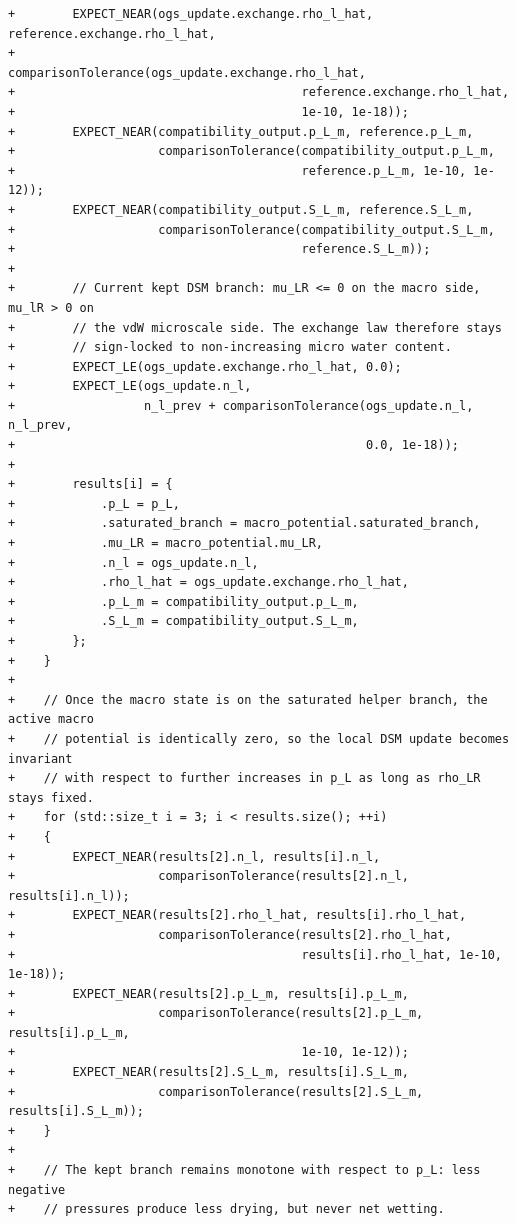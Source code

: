 \documentclass[10pt]{article}
\begin{document}
\begin{lstlisting}
+        EXPECT_NEAR(ogs_update.exchange.rho_l_hat, reference.exchange.rho_l_hat,
+                    comparisonTolerance(ogs_update.exchange.rho_l_hat,
+                                        reference.exchange.rho_l_hat,
+                                        1e-10, 1e-18));
+        EXPECT_NEAR(compatibility_output.p_L_m, reference.p_L_m,
+                    comparisonTolerance(compatibility_output.p_L_m,
+                                        reference.p_L_m, 1e-10, 1e-12));
+        EXPECT_NEAR(compatibility_output.S_L_m, reference.S_L_m,
+                    comparisonTolerance(compatibility_output.S_L_m,
+                                        reference.S_L_m));
+
+        // Current kept DSM branch: mu_LR <= 0 on the macro side, mu_lR > 0 on
+        // the vdW microscale side. The exchange law therefore stays
+        // sign-locked to non-increasing micro water content.
+        EXPECT_LE(ogs_update.exchange.rho_l_hat, 0.0);
+        EXPECT_LE(ogs_update.n_l,
+                  n_l_prev + comparisonTolerance(ogs_update.n_l, n_l_prev,
+                                                 0.0, 1e-18));
+
+        results[i] = {
+            .p_L = p_L,
+            .saturated_branch = macro_potential.saturated_branch,
+            .mu_LR = macro_potential.mu_LR,
+            .n_l = ogs_update.n_l,
+            .rho_l_hat = ogs_update.exchange.rho_l_hat,
+            .p_L_m = compatibility_output.p_L_m,
+            .S_L_m = compatibility_output.S_L_m,
+        };
+    }
+
+    // Once the macro state is on the saturated helper branch, the active macro
+    // potential is identically zero, so the local DSM update becomes invariant
+    // with respect to further increases in p_L as long as rho_LR stays fixed.
+    for (std::size_t i = 3; i < results.size(); ++i)
+    {
+        EXPECT_NEAR(results[2].n_l, results[i].n_l,
+                    comparisonTolerance(results[2].n_l, results[i].n_l));
+        EXPECT_NEAR(results[2].rho_l_hat, results[i].rho_l_hat,
+                    comparisonTolerance(results[2].rho_l_hat,
+                                        results[i].rho_l_hat, 1e-10, 1e-18));
+        EXPECT_NEAR(results[2].p_L_m, results[i].p_L_m,
+                    comparisonTolerance(results[2].p_L_m, results[i].p_L_m,
+                                        1e-10, 1e-12));
+        EXPECT_NEAR(results[2].S_L_m, results[i].S_L_m,
+                    comparisonTolerance(results[2].S_L_m, results[i].S_L_m));
+    }
+
+    // The kept branch remains monotone with respect to p_L: less negative
+    // pressures produce less drying, but never net wetting.

\end{lstlisting}
\end{document}
